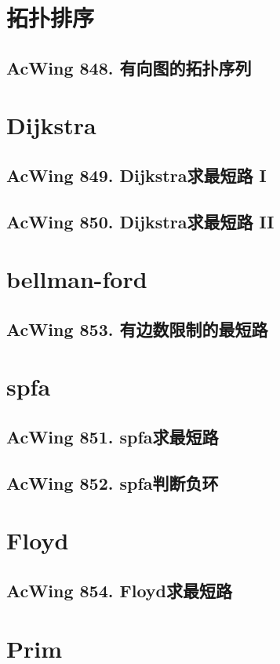\begin{mycpptwocol}
\section{拓扑排序}
\subsection{AcWing 848. 有向图的拓扑序列}

\section{Dijkstra}
\subsection{AcWing 849. Dijkstra求最短路 I}
\subsection{AcWing 850. Dijkstra求最短路 II}

\section{bellman-ford}
\subsection{AcWing 853. 有边数限制的最短路}

\section{spfa}
\subsection{AcWing 851. spfa求最短路}
\subsection{AcWing 852. spfa判断负环}

\section{Floyd}
\subsection{AcWing 854. Floyd求最短路}

\section{Prim}

\end{mycpptwocol}
